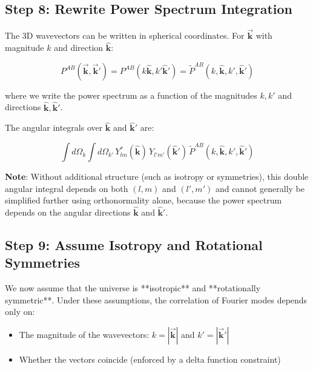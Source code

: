 \subsection{Step 8: Rewrite Power Spectrum Integration}

The 3D wavevectors can be written in spherical coordinates. For $\vec{\mathbf{k}}$ with magnitude $k$ and direction $\hat{\mathbf{k}}$:

\begin{equation}
    P^{AB}(\vec{\mathbf{k}}, \vec{\mathbf{k}}') = P^{AB}(k \hat{\mathbf{k}}, k' \hat{\mathbf{k}}') = \tilde{P}^{AB}(k, \hat{\mathbf{k}}, k', \hat{\mathbf{k}}')
\label{eq:power_spectrum_separable}
\end{equation}

where we write the power spectrum as a function of the magnitudes $k, k'$ and directions $\hat{\mathbf{k}}, \hat{\mathbf{k}}'$.

The angular integrals over $\hat{\mathbf{k}}$ and $\hat{\mathbf{k}}'$ are:

\begin{equation}
    \int d\Omega_k \int d\Omega_{k'} \, Y_{lm}^*(\hat{\mathbf{k}}) \, Y_{l'm'}(\hat{\mathbf{k}}') \, \tilde{P}^{AB}(k, \hat{\mathbf{k}}, k', \hat{\mathbf{k}}')
\label{eq:angular_integral}
\end{equation}

\textbf{Note}: Without additional structure (such as isotropy or symmetries), this double angular integral depends on both $(l,m)$ and $(l',m')$ and cannot generally be simplified further using orthonormality alone, because the power spectrum depends on the angular directions $\hat{\mathbf{k}}$ and $\hat{\mathbf{k}}'$.

\subsection{Step 9: Assume Isotropy and Rotational Symmetries}

We now assume that the universe is **isotropic** and **rotationally symmetric**. Under these assumptions, the correlation of Fourier modes depends only on:
\begin{itemize}
    \item The magnitude of the wavevectors: $k = |\vec{\mathbf{k}}|$ and $k' = |\vec{\mathbf{k}}'|$
    \item Whether the vectors coincide (enforced by a delta function constraint)
\end{itemize}

